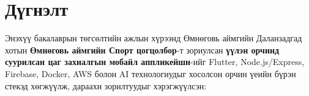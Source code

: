 
\pagecolor{white}

\section*{\centering \huge{Дүгнэлт}}

Энэхүү бакалаврын төгсөлтийн ажлын хүрээнд Өмнөговь аймгийн Даланзадгад хотын \textbf{Өмнөговь аймгийн Спорт цогцолбор}-т зориулсан \textbf{үүлэн орчинд суурилсан цаг захиалгын мобайл аппликейшн}-ийг Flutter, Node.js/Express, Firebase, Docker, AWS болон AI технологиудыг хосолсон орчин үеийн бүрэн стекэд хөгжүүлж, дараахи зорилтуудыг хэрэгжүүлсэн:

